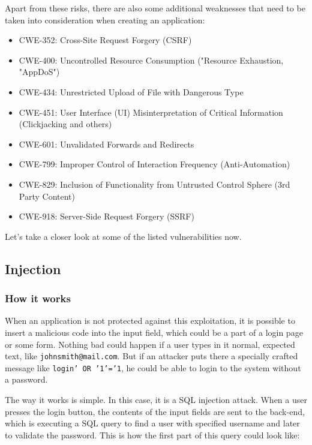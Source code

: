 \documentclass[a4paper]{article}
\begin{document}
Apart from these risks, there are also some additional weaknesses that need to
be taken into consideration when creating an application:

\begin{itemize}
	\item CWE-352: Cross-Site Request Forgery (CSRF)
	\item CWE-400: Uncontrolled Resource Consumption ("Resource Exhaustion,
		"AppDoS")
	\item CWE-434: Unrestricted Upload of File with Dangerous Type
	\item CWE-451: User Interface (UI) Misinterpretation of Critical
		Information (Clickjacking and others)
	\item CWE-601: Unvalidated Forwards and Redirects
	\item CWE-799: Improper Control of Interaction Frequency
		(Anti-Automation)
	\item CWE-829: Inclusion of Functionality from Untrusted Control Sphere
		(3rd Party Content)
	\item CWE-918: Server-Side Request Forgery (SSRF)
\end{itemize}

Let's take a closer look at some of the listed vulnerabilities now.

\subsection{Injection}

\subsubsection{How it works}

When an application is not protected against this exploitation, it is possible
to insert a malicious code into the input field, which could be a part of a
login page or some form. Nothing bad could happen if a user types in it normal,
expected text, like \texttt{johnsmith@mail.com}. But if an attacker puts there
a specially crafted message like \texttt{login' OR '1'='1}, he could be able to
login to the system without a password.

The way it works is simple. In this case, it is a SQL injection attack. When a
user presses the login button, the contents of the input fields are sent to the
back-end, which is executing a SQL query to find a user with specified username
and later to validate the password. This is how the first part of this query
could look like:
\end{document}
